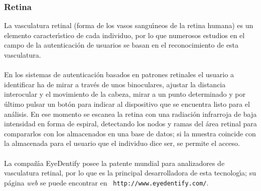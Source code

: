 \subsubsection{Retina}
La vasculatura retinal (forma de los vasos sangu\'{\i}neos de la retina humana)
es un elemento ca\-rac\-ter\'{\i}stico de cada individuo, por lo que numerosos
estudios en el campo de la autenticaci\'on de usuarios se basan en el
reconocimiento de esta vasculatura.\\
\\En los sistemas de autenticaci\'on basados en patrones retinales el usuario
a identificar ha de mirar a trav\'es de unos binoculares, ajustar la distancia
interocular y el movimiento de la cabeza, mirar a un punto determinado y por
\'ultimo pulsar un bot\'on para indicar al
dispositivo que se encuentra listo para el an\'alisis. En ese momento se escanea
la retina con una radiaci\'on infrarroja de baja intensidad en forma de espiral,
detectando los nodos y ramas del \'area retinal para compararlos con los 
almacenados en una base de datos; si la muestra coincide con la almacenada para
el usuario que el individuo dice ser, se permite el acceso.\\
\\La compa\~n\'{\i}a EyeDentify posee la patente mundial para analizadores de
vasculatura retinal, por lo que es la principal desarrolladora de esta 
tecnolog\'{\i}a; su p\'agina {\it web} se puede encontrar en {\tt 
http://www.eyedentify.com/}.
